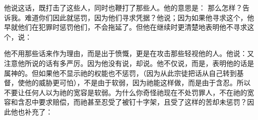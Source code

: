 他说这话，既打击了这些人，同时也鞭打了那些人。他的意思是： 那么怎样？告诉我。难道你们因此就惩罚，因为他们寻求凭据？他说；因为如果他寻求这个，他早就他们在犯罪时惩罚他们，不会拖延了。但他在继续时更清楚地表明他不寻求这个，说： \par

他不用那些话来作为理由，而是出于愤慨，更是在攻击那些轻视他的人。他说：又注意他所说的话有多严厉。因为他没有说，却说。他不仅说，而是，表明他的话是属神的。但如果他不显示祂的权能也不惩罚，（因为从此宗徒把话从自己转到基督，使他的威胁更可怕），不是由于软弱，因为祂能这样做，而是由于含忍。所以不要让任何人以为祂的宽容是软弱。为什么你奇怪祂现在不处罚罪人，不在祂的宽容和含忍中要求赔偿，而祂甚至忍受了被钉十字架，且受了这样的苦却未惩罚？因此他也补充了：\par

\par

